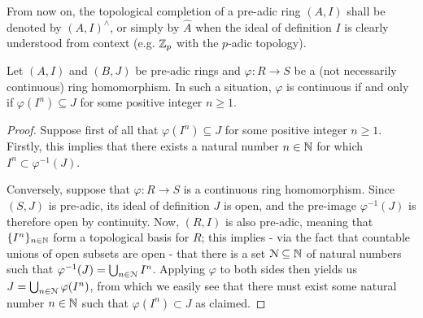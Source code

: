             \begin{convention} \label{conv: adic_completions}
                From now on, the topological completion of a pre-adic ring $(A, I)$ shall be denoted by $(A, I)^{\wedge}$, or simply by $\hat{A}$ when the ideal of definition $I$ is clearly understood from context (e.g. $\mathbb{Z}_p$ with the $p$-adic topology).
            \end{convention}
            \begin{proposition} \label{prop: continuity_criterion_for_homomorphisms_between_pre_adic_rings}
                Let $(A, I)$ and $(B, J)$ be pre-adic rings and $\varphi: R \to S$ be a (not necessarily continuous) ring homomorphism. In such a situation, $\varphi$ is continuous if and only if $\varphi(I^n) \subseteq J$ for some positive integer $n \geq 1$. 
            \end{proposition}
                \begin{proof}
                    Suppose first of all that $\varphi(I^n) \subseteq J$ for some positive integer $n \geq 1$. Firstly, this implies that there exists a natural number $n \in \mathbb{N}$ for which $I^n \subset \varphi^{-1}(J)$. 
                    
                    Conversely, suppose that $\varphi: R \to S$ is a continuous ring homomorphism. Since $(S, J)$ is pre-adic, its ideal of definition $J$ is open, and the pre-image $\varphi^{-1}(J)$ is therefore open by continuity. Now, $(R, I)$ is also pre-adic, meaning that $\{I^n\}_{n \in \mathbb{N}}$ form a topological basis for $R$; this implies - via the fact that countable unions of open subsets are open - that there is a set $\mathcal{N} \subseteq \mathbb{N}$ of natural numbers such that $\varphi^{-1}(J) = \bigcup_{n \in \mathcal{N}} I^n$. Applying $\varphi$ to both sides then yields us $J = \bigcup_{n \in \mathcal{N}} \varphi(I^n)$, from which we easily see that there must exist some natural number $n \in \mathbb{N}$ such that $\varphi(I^n) \subset J$ as claimed. 
                \end{proof}
